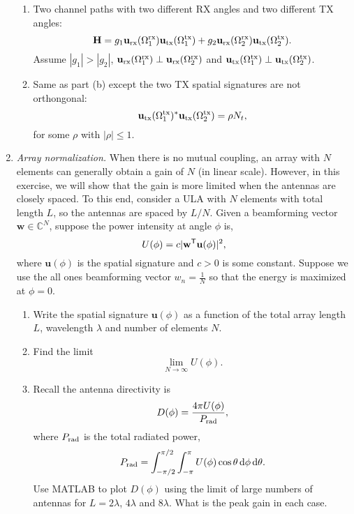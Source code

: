 \documentclass[11pt]{article}
\def\C{{\mathbb{C}}}
\newcommand{\ubf}{\mathbf{u}}
\newcommand{\wbf}{\mathbf{w}}
\newcommand{\Hbf}{\mathbf{H}}
\newcommand{\tran}{^{\text{\sf T}}}
\begin{document}
\begin{enumerate}
\begin{enumerate}[label=(\alph*)]
\item Two channel paths with two different RX angles
and two different TX angles:
\[
    \Hbf = g_1
        \ubf_{\rm rx}(\Omega_1^{\rm rx}) \ubf_{\rm tx}(\Omega_1^{\rm tx}) +
        g_2 \ubf_{\rm rx}(\Omega_2^{\rm rx}) \ubf_{\rm tx}(\Omega_2^{\rm tx}).
\]
Assume $|g_1| > |g_2|$, $\ubf_{\rm rx}(\Omega_1^{\rm rx}) \perp \ubf_{\rm rx}(\Omega_2^{\rm rx})$ and $\ubf_{\rm tx}(\Omega_1^{\rm tx}) \perp \ubf_{\rm tx}(\Omega_2^{\rm tx})$.

\item Same as part (b) except the two TX spatial signatures are not orthongonal:
\[
    \ubf_{\rm tx}(\Omega_1^{\rm tx})^*\ubf_{\rm tx}(\Omega_2^{\rm tx})  =\rho N_t,
\]
for some $\rho$ with $|\rho|\leq 1$.

\end{enumerate}

\item \emph{Array normalization.}  When there is no mutual coupling,
an array with $N$ elements can generally obtain a gain of $N$ (in linear scale).
However, in this exercise, we will show that the gain is more limited when the
antennas are closely spaced.  To this end, consider a  ULA with $N$ elements
with total length $L$, so the antennas are spaced by $L/N$.
Given a beamforming vector $\wbf \in \C^N$,
suppose the power intensity at angle $\phi$ is,
\[
    U(\phi) = c|\wbf\tran \ubf(\phi)|^2,
\]
where $\ubf(\phi)$ is the spatial signature and $c > 0$ is some constant.
Suppose we use the all ones beamforming vector $w_n = \frac{1}{N}$ so that the
energy is maximized at $\phi = 0$.
\begin{enumerate}[label=(\alph*)]
\item Write the spatial signature $\ubf(\phi)$ as a function of the total array length
$L$, wavelength $\lambda$ and number of elements $N$.

\item Find the limit
\[
    \lim_{N \rightarrow \infty} U(\phi).
\]

\item Recall the antenna directivity is
\[
    D(\phi) = \frac{4\pi U(\phi)}{P_{\rm rad}},
\]
where $P_{\rm rad}$ is the total radiated power,
\[
    P_{\rm rad} = \int_{-\pi/2}^{\pi/2} \int_{-\pi}^{\pi} U(\phi)\cos \theta \,
        \dd \phi \,\dd \theta.
\]
Use MATLAB to plot $D(\phi)$ using the limit of large numbers of antennas for $L=2\lambda$,
$4\lambda$ and $8\lambda$.  What is the peak gain in each case.


\end{enumerate}




\end{enumerate}
\end{document}
